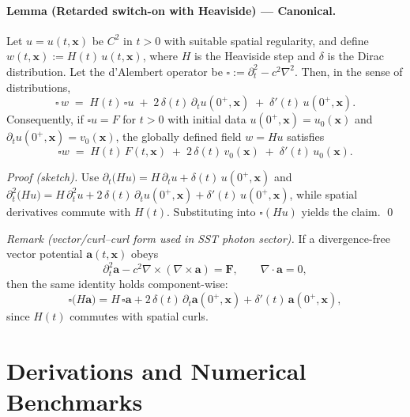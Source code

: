 \documentclass[10pt,reprint,aps,onecolumn,nofootinbib]{revtex4-2}
\begin{document}
\paragraph{Lemma (Retarded switch-on with Heaviside) — Canonical.}
    Let $u=u(t,\mathbf{x})$ be $C^2$ in $t>0$ with suitable spatial regularity, and define $w(t,\mathbf{x}) := H(t)\,u(t,\mathbf{x})$, where $H$ is the Heaviside step and $\delta$ is the Dirac distribution.
    Let the d’Alembert operator be $\square := \partial_t^2 - c^2 \nabla^2$. Then, in the sense of distributions,
    \[
        \square\,w \;=\; H(t)\,\square u \;+\; 2\,\delta(t)\,\partial_t u(0^+,\mathbf{x}) \;+\; \delta'(t)\,u(0^+,\mathbf{x}).
    \]
    Consequently, if $\square u = F$ for $t>0$ with initial data $u(0^+,\mathbf{x})=u_0(\mathbf{x})$ and $\partial_t u(0^+,\mathbf{x})=v_0(\mathbf{x})$, the globally defined field $w=H u$ satisfies
    \[
        \square w \;=\; H(t)\,F(t,\mathbf{x}) \;+\; 2\,\delta(t)\,v_0(\mathbf{x}) \;+\; \delta'(t)\,u_0(\mathbf{x}).
    \]

    \emph{Proof (sketch).}
    Use $\partial_t\!\big(Hu\big)=H\,\partial_t u+\delta(t)\,u(0^+,\mathbf{x})$ and
    $\partial_t^2\!\big(Hu\big)=H\,\partial_t^2u+2\,\delta(t)\,\partial_t u(0^+,\mathbf{x})+\delta'(t)\,u(0^+,\mathbf{x})$,
    while spatial derivatives commute with $H(t)$. Substituting into $\square(Hu)$ yields the claim. \qed

    \emph{Remark (vector/curl–curl form used in SST photon sector).}
    If a divergence-free vector potential $\mathbf{a}(t,\mathbf{x})$ obeys
    \[
        \partial_t^2 \mathbf{a} - c^2 \nabla\times(\nabla\times \mathbf{a}) = \mathbf{F},\qquad \nabla\!\cdot\!\mathbf{a}=0,
    \]
    then the same identity holds component-wise:
    \[
        \square\!\big(H\mathbf{a}\big) = H\,\square\mathbf{a} + 2\,\delta(t)\,\partial_t \mathbf{a}(0^+,\mathbf{x}) + \delta'(t)\,\mathbf{a}(0^+,\mathbf{x}),
    \]
    since $H(t)$ commutes with spatial curls.

\section{Derivations and Numerical Benchmarks}
\label{app:three-swirl-derivations}
\end{document}
